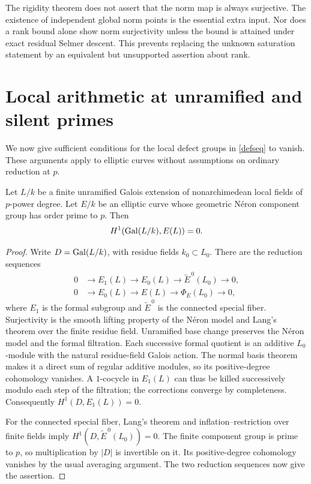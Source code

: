 \documentclass[11pt,a4paper]{article}
\numberwithin{equation}{section}
\begin{document}
\begin{remark}
The rigidity theorem does not assert that the norm map is always surjective. The existence of independent global norm points is the essential extra input. Nor does a rank bound alone show norm surjectivity unless the bound is attained under exact residual Selmer descent. This prevents replacing the unknown saturation statement by an equivalent but unsupported assertion about rank.
\end{remark}
\section{Local arithmetic at unramified and silent primes}\label{local}
We now give sufficient conditions for the local defect groups in \eqref{defseq} to vanish. These arguments apply to elliptic curves without assumptions on ordinary reduction at $p$.
\begin{proposition}\label{unram}
Let $L/k$ be a finite unramified Galois extension of nonarchimedean local fields of $p$-power degree. Let $E/k$ be an elliptic curve whose geometric N\'eron component group has order prime to $p$. Then
\[ H^1(\operatorname{Gal}(L/k),E(L))=0. \]
\end{proposition}
\begin{proof}
Write $D=\operatorname{Gal}(L/k)$, with residue fields $k_0\subset L_0$. There are the reduction sequences
\begin{align*}
0&\to E_1(L)\to E_0(L)\to \widetilde E^{\,0}(L_0)\to0,\\
0&\to E_0(L)\to E(L)\to \Phi_E(L_0)\to0,
\end{align*}
where $E_1$ is the formal subgroup and $\widetilde E^{\,0}$ is the connected special fiber. Surjectivity is the smooth lifting property of the N\'eron model and Lang's theorem over the finite residue field. Unramified base change preserves the N\'eron model and the formal filtration. Each successive formal quotient is an additive $L_0$-module with the natural residue-field Galois action. The normal basis theorem makes it a direct sum of regular additive modules, so its positive-degree cohomology vanishes. A $1$-cocycle in $E_1(L)$ can thus be killed successively modulo each step of the filtration; the corrections converge by completeness. Consequently $H^1(D,E_1(L))=0$.

For the connected special fiber, Lang's theorem and inflation--restriction over finite fields imply $H^1(D,\widetilde E^{\,0}(L_0))=0$. The finite component group is prime to $p$, so multiplication by $|D|$ is invertible on it. Its positive-degree cohomology vanishes by the usual averaging argument. The two reduction sequences now give the assertion.
\end{proof}
\end{document}
